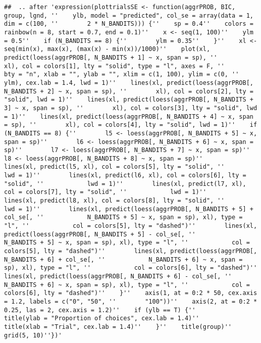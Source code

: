 \documentclass[11pt,,]{article}
\begin{document}
\begin{verbatim}
##  .. after 'expression(plottrialsSE <- function(aggrPROB, BIC, group, lgnd, ''    ylb, model = "predicted", col_se = array(data = 1, dim = c(100, ''        2 * N_BANDITS))) {''    sp = 0.4''    colors = rainbow(n = 8, start = 0.7, end = 0.1)''    x <- seq(1, 100)''    ylm = 0.5''    if (N_BANDITS == 8) {''        ylm = 0.35''    }''    xl <- seq(min(x), max(x), (max(x) - min(x))/1000)''    plot(xl, predict(loess(aggrPROB[, N_BANDITS + 1] ~ x, span = sp), ''        xl), col = colors[1], lty = "solid", type = "l", axes = F, ''        bty = "n", xlab = "", ylab = "", xlim = c(1, 100), ylim = c(0, ''            ylm), cex.lab = 1.4, lwd = 1)''    lines(xl, predict(loess(aggrPROB[, N_BANDITS + 2] ~ x, span = sp), ''        xl), col = colors[2], lty = "solid", lwd = 1)''    lines(xl, predict(loess(aggrPROB[, N_BANDITS + 3] ~ x, span = sp), ''        xl), col = colors[3], lty = "solid", lwd = 1)''    lines(xl, predict(loess(aggrPROB[, N_BANDITS + 4] ~ x, span = sp), ''        xl), col = colors[4], lty = "solid", lwd = 1)''    if (N_BANDITS == 8) {''        l5 <- loess(aggrPROB[, N_BANDITS + 5] ~ x, span = sp)''        l6 <- loess(aggrPROB[, N_BANDITS + 6] ~ x, span = sp)''        l7 <- loess(aggrPROB[, N_BANDITS + 7] ~ x, span = sp)''        l8 <- loess(aggrPROB[, N_BANDITS + 8] ~ x, span = sp)''        lines(xl, predict(l5, xl), col = colors[5], lty = "solid", ''            lwd = 1)''        lines(xl, predict(l6, xl), col = colors[6], lty = "solid", ''            lwd = 1)''        lines(xl, predict(l7, xl), col = colors[7], lty = "solid", ''            lwd = 1)''        lines(xl, predict(l8, xl), col = colors[8], lty = "solid", ''            lwd = 1)''        lines(xl, predict(loess(aggrPROB[, N_BANDITS + 5] + col_se[, ''            N_BANDITS + 5] ~ x, span = sp), xl), type = "l", ''            col = colors[5], lty = "dashed")''        lines(xl, predict(loess(aggrPROB[, N_BANDITS + 5] - col_se[, ''            N_BANDITS + 5] ~ x, span = sp), xl), type = "l", ''            col = colors[5], lty = "dashed")''        lines(xl, predict(loess(aggrPROB[, N_BANDITS + 6] + col_se[, ''            N_BANDITS + 6] ~ x, span = sp), xl), type = "l", ''            col = colors[6], lty = "dashed")''        lines(xl, predict(loess(aggrPROB[, N_BANDITS + 6] - col_se[, ''            N_BANDITS + 6] ~ x, span = sp), xl), type = "l", ''            col = colors[6], lty = "dashed")''    }''    axis(1, at = 0:2 * 50, cex.axis = 1.2, labels = c("0", "50", ''        "100"))''    axis(2, at = 0:2 * 0.25, las = 2, cex.axis = 1.2)''    if (ylb == T) {''        title(ylab = "Proportion of choices", cex.lab = 1.4)''        title(xlab = "Trial", cex.lab = 1.4)''    }''    title(group)''    grid(5, 10)''})'

\end{verbatim}
\end{document}

